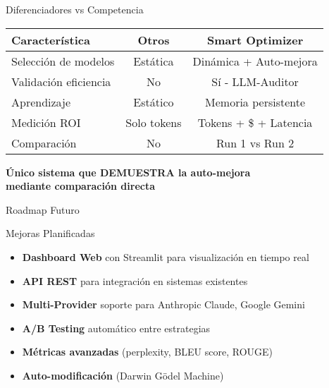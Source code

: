 \documentclass[aspectratio=169,11pt]{beamer}
\begin{document}
\begin{frame}{Diferenciadores vs Competencia}
\begin{table}[h]
\centering
\small
\begin{tabular}{|l|c|c|}
\hline
\textbf{Característica} & \textbf{Otros} & \textbf{Smart Optimizer} \\ \hline
Selección de modelos & Estática & \textcolor{kavakgreen}{Dinámica + Auto-mejora} \\ \hline
Validación eficiencia & No & \textcolor{kavakgreen}{Sí - LLM-Auditor} \\ \hline
Aprendizaje & Estático & \textcolor{kavakgreen}{Memoria persistente} \\ \hline
Medición ROI & Solo tokens & \textcolor{kavakgreen}{Tokens + \$ + Latencia} \\ \hline
Comparación & No & \textcolor{kavakgreen}{Run 1 vs Run 2} \\ \hline
\end{tabular}
\end{table}

\vspace{0.5cm}

\begin{center}
\Large \textbf{Único sistema que DEMUESTRA la auto-mejora} \\
\Large \textbf{mediante comparación directa}
\end{center}
\end{frame}

\begin{frame}{Roadmap Futuro}
\begin{block}{Mejoras Planificadas}
\begin{itemize}
    \item \textbf{Dashboard Web} con Streamlit para visualización en tiempo real
    \item \textbf{API REST} para integración en sistemas existentes
    \item \textbf{Multi-Provider} soporte para Anthropic Claude, Google Gemini
    \item \textbf{A/B Testing} automático entre estrategias
    \item \textbf{Métricas avanzadas} (perplexity, BLEU score, ROUGE)
    \item \textbf{Auto-modificación} (Darwin Gödel Machine)
\end{itemize}
\end{block}
\end{frame}
\end{document}
